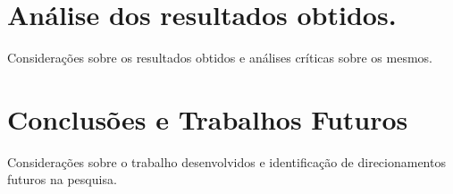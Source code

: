 \documentclass[12pt]{article}
\begin{document}
\section{Análise dos resultados obtidos.}

Considerações sobre os resultados obtidos e análises críticas sobre os mesmos.

\section{Conclusões e Trabalhos Futuros}\label{sec:figs}


Considerações sobre o trabalho desenvolvidos e identificação de direcionamentos futuros na
pesquisa.





\end{document}

